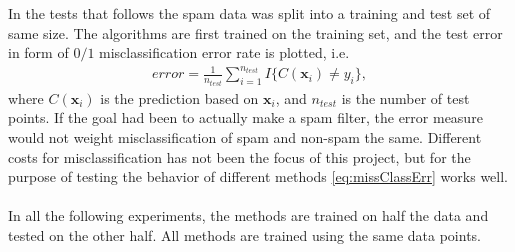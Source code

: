  In the tests that follows the spam data was split into a training and test set of same size. The algorithms are first trained on the training set, and the test error in form of $0/1$ misclassification error rate is plotted, i.e.
 \begin{align}
   \label{eq:missClassErr} 
   error =  \frac{1}{n_{test}} \sum_{i = 1}^{n_{test}} I\{C(\mathbf{x}_i) \neq y_i\},
 \end{align}
 where $C(\mathbf{x}_i)$ is the prediction based on $\mathbf{x}_i$, and $n_{test}$ is the number of test points. If the goal had been to actually make a spam filter, the error measure would not weight misclassification of spam and non-spam the same. Different costs for misclassification has not been the focus of this project, but for the purpose of testing the behavior of different methods \eqref{eq:missClassErr} works well.
\\ 
\\
In all the following experiments, the methods are trained on half the data and tested on the other half. All methods are trained using the same data points. 

